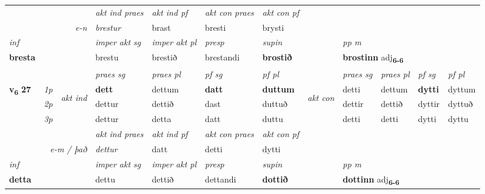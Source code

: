 \begin{longtable}[l]{X>{\footnotesize\itshape}llXXXXlXXXX}
   && &  \textit{akt ind praes} & \textit{akt ind pf} & \textit{akt con praes} & \textit{akt con pf} \\*
\multicolumn{3}{r}{\textit{e-n}} & brestur & brast & bresti & brysti \\*

\cmidrule{4-7}
   {\textit{inf}} & &  & \textit{imper akt sg} & \textit{imper akt pl}   & \textit{presp} & \textit{supin}  && \textit{pp m} \\*
  {\textbf{bresta}} & && brestu  & brestið   & brestandi &  \textbf{brostið}  && \multicolumn{2}{l}{\textbf{brostinn} adj\textbf{\textsubscript{6-6}}} \\*

\midrule

 & &   & \textit{praes sg}  & \textit{praes pl}    & \textit{ pf sg} & \textit{pf pl} & & \textit{praes sg}  & \textit{praes pl}    & \textit{pf sg} & \textit{pf pl }  \\ \cmidrule{4-7} \cmidrule{9-12}
 \multirow{2}{*}{{{\textbf{v{\textsubscript{6}}} \Large{\textbf{27}}}}}  & 1p & \multirow{3}{*}{\begin{turn}{90}\textit{akt ind}\end{turn}} & \textbf{dett} & dettum & \textbf{datt} & \textbf{duttum} & \multirow{3}{*}{\begin{turn}{90}\textit{akt con}\end{turn}} &detti & dettum & \textbf{dytti} & dyttum\\*
 & 2p &  &  dettur  & dettið & dast & duttuð & & dettir & dettið & dyttir & dyttuð \\*
 & 3p &  & dettur & detta & datt & duttu & & detti & detti& dytti & dyttu \\*
\cmidrule{4-7} \cmidrule{9-12}

   && &  \textit{akt ind praes} & \textit{akt ind pf} & \textit{akt con praes} & \textit{akt con pf} \\*
\multicolumn{3}{r}{\textit{e-m / það}} & dettur & datt & detti & dytti \\*

\cmidrule{4-7}
   {\textit{inf}} & &  & \textit{imper akt sg} & \textit{imper akt pl}   & \textit{presp} & \textit{supin}  && \textit{pp m} \\*
  {\textbf{detta}} & && dettu  & dettið   & dettandi &  \textbf{dottið}  && \multicolumn{2}{l}{\textbf{dottinn} adj\textbf{\textsubscript{6-6}}} \\*

\midrule


\end{longtable}
